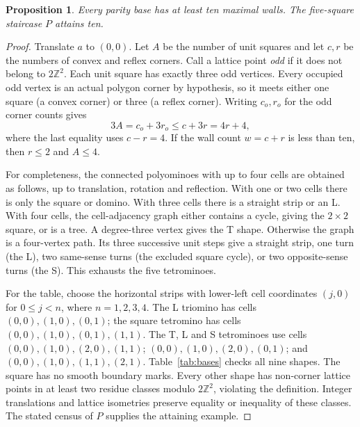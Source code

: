 \documentclass[11pt]{article}
\newtheorem{proposition}[theorem]{Proposition}
\theoremstyle{definition}\newtheorem{definition}[theorem]{Definition}
\begin{document}
\begin{proposition}\label{prop:base}
Every parity base has at least ten maximal walls. The five-square staircase $P$ attains ten.
\end{proposition}
\begin{proof}
Translate $a$ to $(0,0)$. Let $A$ be the number of unit squares and let $c,r$ be the numbers of convex and reflex corners. Call a lattice point \emph{odd} if it does not belong to $2\mathbb Z^2$. Each unit square has exactly three odd vertices. Every occupied odd vertex is an actual polygon corner by hypothesis, so it meets either one square (a convex corner) or three (a reflex corner). Writing $c_o,r_o$ for the odd corner counts gives
\[
 3A=c_o+3r_o\le c+3r=4r+4,
\]
where the last equality uses $c-r=4$.
If the wall count $w=c+r$ is less than ten, then $r\le2$ and $A\le4$.

For completeness, the connected polyominoes with up to four cells are obtained as follows, up to translation, rotation and reflection. With one or two cells there is only the square or domino. With three cells there is a straight strip or an L. With four cells, the cell-adjacency graph either contains a cycle, giving the $2\times2$ square, or is a tree. A degree-three vertex gives the T shape. Otherwise the graph is a four-vertex path. Its three successive unit steps give a straight strip, one turn (the L), two same-sense turns (the excluded square cycle), or two opposite-sense turns (the S). This exhausts the five tetrominoes.

For the table, choose the horizontal strips with lower-left cell coordinates $(j,0)$ for $0\le j<n$, where $n=1,2,3,4$. The L triomino has cells $(0,0),(1,0),(0,1)$; the square tetromino has cells $(0,0),(1,0),(0,1),(1,1)$. The T, L and S tetrominoes use cells $(0,0),(1,0),(2,0),(1,1)$; $(0,0),(1,0),(2,0),(0,1)$; and $(0,0),(1,0),(1,1),(2,1)$. Table~\ref{tab:bases} checks all nine shapes. The square has no smooth boundary marks. Every other shape has non-corner lattice points in at least two residue classes modulo $2\mathbb Z^2$, violating the definition. Integer translations and lattice isometries preserve equality or inequality of these classes. The stated census of $P$ supplies the attaining example.
\end{proof}
\end{document}

